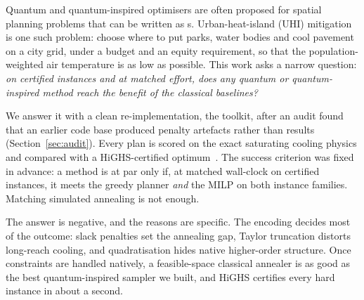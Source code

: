 Quantum and quantum-inspired optimisers are often proposed for spatial planning problems that can
be written as \QUBO{}s. Urban-heat-island (UHI) mitigation is one such problem: choose where to put
parks, water bodies and cool pavement on a city grid, under a budget and an equity requirement, so
that the population-weighted air temperature is as low as possible. This work asks a narrow
question: \emph{on certified instances and at matched effort, does any quantum or quantum-inspired
method reach the benefit of the classical baselines?}

We answer it with a clean re-implementation, the  toolkit, after an audit found that an
earlier code base produced penalty artefacts rather than results
(Section~\ref{sec:audit}). Every plan is scored on the exact saturating cooling physics and
compared with a HiGHS-certified optimum~\cite{huangfu2018}. The success criterion was fixed in
advance: a method is at par only if, at matched wall-clock on certified instances, it meets the
greedy planner \emph{and} the MILP on both instance families. Matching simulated annealing is not
enough.

The answer is negative, and the reasons are specific. The encoding decides most of the outcome:
slack penalties set the annealing gap, Taylor truncation distorts long-reach cooling, and
quadratisation hides native higher-order structure. Once constraints are handled natively, a
feasible-space classical annealer is as good as the best quantum-inspired sampler we built, and
HiGHS certifies every hard instance in about a second.
